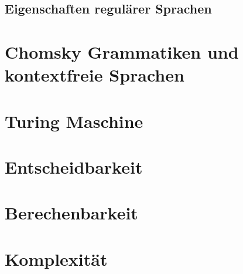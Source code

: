 \documentclass[12pt,a4paper]{article}
\begin{document}
\subsection{Eigenschaften regulärer Sprachen}

\section{Chomsky Grammatiken und kontextfreie Sprachen}

\section{Turing Maschine}

\section{Entscheidbarkeit}

\section{Berechenbarkeit}

\section{Komplexität}
\end{document}
